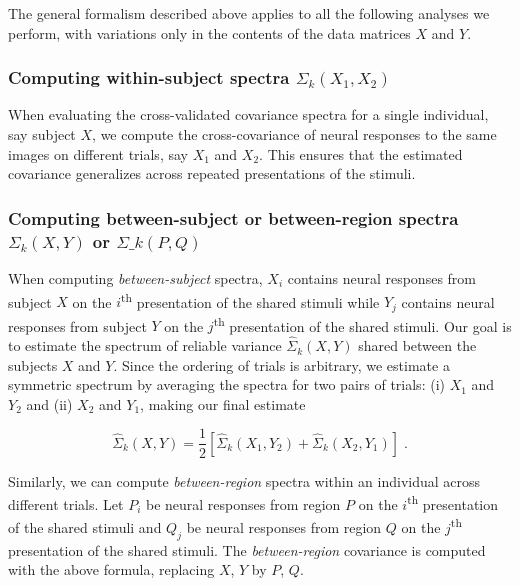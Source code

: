 \documentclass[10pt]{article}
\begin{document}
The general formalism described above applies to all the following analyses we perform, with variations only in the contents of the data matrices \(X\) and \(Y\).

\subsubsection{\texorpdfstring{Computing within-subject spectra \(\Sigma_k(X_1, X_2)\)}{Computing within-subject spectra \textbackslash Sigma\_k(X\_1, X\_2)}}\label{computing-within-subject-spectra-sigma_kx_1-x_2}

When evaluating the cross-validated covariance spectra for a single individual, say subject \(X\), we compute the cross-covariance of neural responses to the same images on different trials, say \(X_1\) and \(X_2\). This ensures that the estimated covariance generalizes across repeated presentations of the stimuli.

\subsubsection{\texorpdfstring{Computing between-subject or between-region spectra \(\Sigma_k(X, Y)\) or \(\Sigma\_k(P, Q)\)}{Computing between-subject or between-region spectra \textbackslash Sigma\_k(X, Y) or \textbackslash Sigma\textbackslash\_k(P, Q)}}\label{computing-between-subject-or-between-region-spectra-sigma_kx-y-or-sigma_kp-q}

When computing \emph{between-subject} spectra, \(X_i\) contains neural responses from subject \(X\) on the \(i\)\textsuperscript{th} presentation of the shared stimuli while \(Y_j\) contains neural responses from subject \(Y\) on the \(j\)\textsuperscript{th} presentation of the shared stimuli. Our goal is to estimate the spectrum of reliable variance \(\hat{\Sigma}_k(X, Y)\) shared between the subjects \(X\) and \(Y\). Since the ordering of trials is arbitrary, we estimate a symmetric spectrum by averaging the spectra for two pairs of trials: (i) \(X_1\) and \(Y_2\) and (ii) \(X_2\) and \(Y_1\), making our final estimate

\[
\hat{\Sigma}_k(X, Y) = \frac{1}{2}\left[\hat{\Sigma}_k(X_1, Y_2) + \hat{\Sigma}_k(X_2, Y_1)\right]\;.
\]

Similarly, we can compute \emph{between-region} spectra within an individual across different trials. Let \(P_i\) be neural responses from region \(P\) on the \(i\)\textsuperscript{th} presentation of the shared stimuli and \(Q_j\) be neural responses from region \(Q\) on the \(j\)\textsuperscript{th} presentation of the shared stimuli. The \emph{between-region} covariance is computed with the above formula, replacing \(X\), \(Y\) by \(P\), \(Q\).
\end{document}
